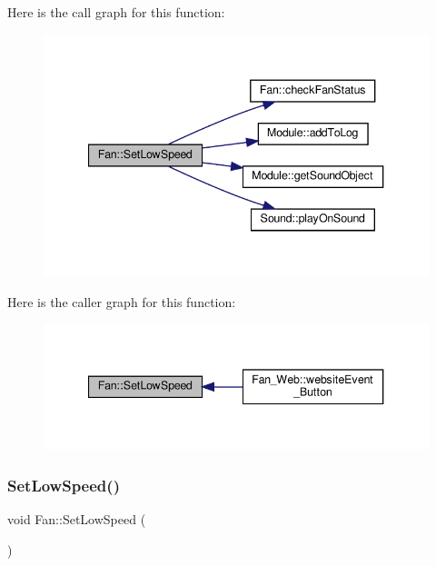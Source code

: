 Here is the call graph for this function\+:
\nopagebreak
\begin{figure}[H]
\begin{center}
\leavevmode
\includegraphics[width=340pt]{class_fan_a817f97adfe3990ef302f49359b3237f7_cgraph}
\end{center}
\end{figure}
Here is the caller graph for this function\+:
\nopagebreak
\begin{figure}[H]
\begin{center}
\leavevmode
\includegraphics[width=340pt]{class_fan_a817f97adfe3990ef302f49359b3237f7_icgraph}
\end{center}
\end{figure}
\mbox{\label{class_fan_a817f97adfe3990ef302f49359b3237f7}} 
\subsubsection{\texorpdfstring{Set\+Low\+Speed()}{SetLowSpeed()}\hspace{0.1cm}{\footnotesize\ttfamily [2/2]}}
{\footnotesize\ttfamily void Fan\+::\+Set\+Low\+Speed (\begin{DoxyParamCaption}{ }\end{DoxyParamCaption})\hspace{0.3cm}{\ttfamily [protected]}}

